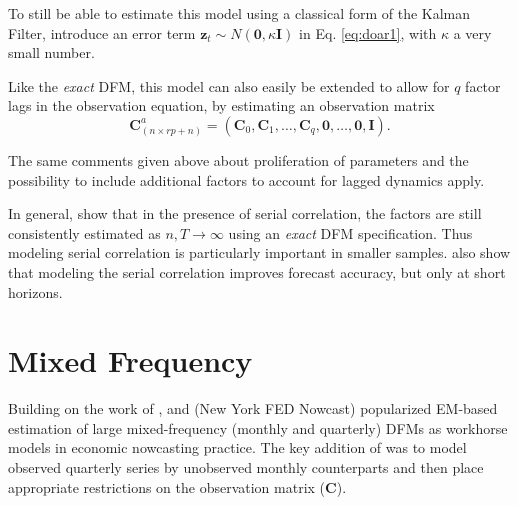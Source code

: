 \documentclass[a4paper]{article}
\begin{document}
To still be able to estimate this model using a classical form of the Kalman Filter, \citet{banbura2014maximum} introduce an error term $\textbf{z}_t \sim N(\textbf{0}, \kappa \textbf{I})$ in Eq. \ref{eq:doar1}, with $\kappa$ a very small number. \newline

Like the \emph{exact} DFM, this model can also easily be extended to allow for $q$ factor lags in the observation equation, by estimating an observation matrix
\begin{equation}
\textbf{C}^a_{(n \times rp+n)}  = (\textbf{C}_0, \textbf{C}_1, \dots, \textbf{C}_q, \textbf{0}, \dots, \textbf{0}, \textbf{I}).
\end{equation}

The same comments given above about proliferation of parameters and the possibility to include additional factors to account for lagged dynamics apply. \newline 

In general, \citet{doz2011two, doz2012quasi} show that in the presence of serial correlation, the factors are still consistently estimated as $n, T \to \infty$ using an \emph{exact} DFM specification. Thus modeling serial correlation is particularly important in smaller samples. \citet{banbura2014maximum} also show that modeling the serial correlation improves forecast accuracy, but only at short horizons.

\newpage 

\section{Mixed Frequency}

Building on the work of \citet{mariano2003new}, \citet{banbura2014maximum} and \citet{bok2018macroeconomic} (New York FED Nowcast) popularized EM-based estimation of large mixed-frequency (monthly and quarterly) DFMs as workhorse models in economic nowcasting practice. The key addition of \citet{mariano2003new} was to model observed quarterly series by unobserved monthly counterparts and then place appropriate restrictions on the observation matrix (\textbf{C}). \newline 
\end{document}
